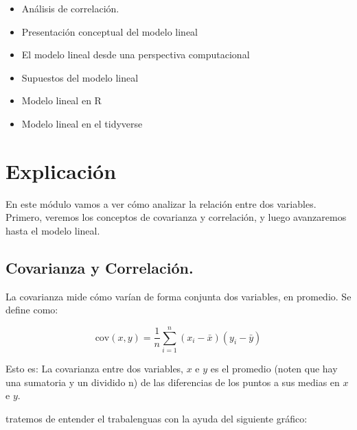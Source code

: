 \documentclass[]{book}
\newenvironment{Shaded}{\begin{snugshade}}{\end{snugshade}}
\newcommand{\DataTypeTok}[1]{\textcolor[rgb]{0.13,0.29,0.53}{#1}}
\newcommand{\KeywordTok}[1]{\textcolor[rgb]{0.13,0.29,0.53}{\textbf{#1}}}
\newcommand{\NormalTok}[1]{#1}
\newcommand{\OperatorTok}[1]{\textcolor[rgb]{0.81,0.36,0.00}{\textbf{#1}}}
\newcommand{\OtherTok}[1]{\textcolor[rgb]{0.56,0.35,0.01}{#1}}
\providecommand{\tightlist}{%
  \setlength{\itemsep}{0pt}\setlength{\parskip}{0pt}}
\begin{document}
\begin{itemize}
\tightlist
\item
  Análisis de correlación.
\item
  Presentación conceptual del modelo lineal
\item
  El modelo lineal desde una perspectiva computacional
\item
  Supuestos del modelo lineal
\item
  Modelo lineal en R
\item
  Modelo lineal en el tidyverse
\end{itemize}

\hypertarget{explicacion-6}{%
\section{Explicación}\label{explicacion-6}}

En este módulo vamos a ver cómo analizar la relación entre dos variables. Primero, veremos los conceptos de covarianza y correlación, y luego avanzaremos hasta el modelo lineal.

\begin{Shaded}
\end{Shaded}

\hypertarget{covarianza-y-correlacion.}{%
\subsection{Covarianza y Correlación.}\label{covarianza-y-correlacion.}}

La covarianza mide cómo varían de forma conjunta dos variables, en promedio. Se define como:

\[
\text{cov}(x,y)=\frac{1}{n}\sum_{i=1}^n(x_i-\bar x)(y_i-\bar y)
\]

Esto es: La covarianza entre dos variables, \(x\) e \(y\) es el promedio (noten que hay una sumatoria y un dividido n) de las diferencias de los puntos a sus medias en \(x\) e \(y\).

tratemos de entender el trabalenguas con la ayuda del siguiente gráfico:
\end{document}
